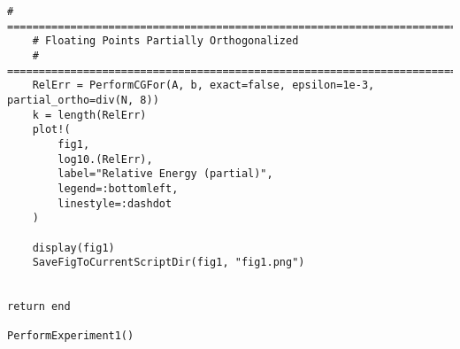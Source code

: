 \documentclass[]{article}
\theoremstyle{definition}
\begin{document}
\begin{lstlisting}[language=JuliaLocal, style=julia]
    # ==========================================================================
    # Floating Points Partially Orthogonalized
    # ==========================================================================
    RelErr = PerformCGFor(A, b, exact=false, epsilon=1e-3, partial_ortho=div(N, 8))
    k = length(RelErr)
    plot!(
        fig1, 
        log10.(RelErr), 
        label="Relative Energy (partial)",
        legend=:bottomleft, 
        linestyle=:dashdot
    )

    display(fig1)
    SaveFigToCurrentScriptDir(fig1, "fig1.png")

    
return end

PerformExperiment1()
        
    \end{lstlisting}
\end{document}
